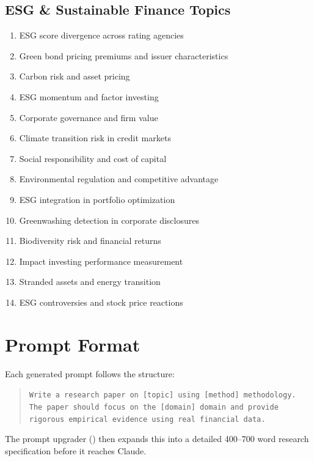 \subsection{ESG \& Sustainable Finance Topics}

\begin{enumerate}
  \item ESG score divergence across rating agencies
  \item Green bond pricing premiums and issuer characteristics
  \item Carbon risk and asset pricing
  \item ESG momentum and factor investing
  \item Corporate governance and firm value
  \item Climate transition risk in credit markets
  \item Social responsibility and cost of capital
  \item Environmental regulation and competitive advantage
  \item ESG integration in portfolio optimization
  \item Greenwashing detection in corporate disclosures
  \item Biodiversity risk and financial returns
  \item Impact investing performance measurement
  \item Stranded assets and energy transition
  \item ESG controversies and stock price reactions
\end{enumerate}

\section{Prompt Format}
\label{sec:prompts:format}

Each generated prompt follows the structure:

\begin{quote}
\texttt{Write a research paper on [topic] using [method] methodology.
The paper should focus on the [domain] domain and provide rigorous empirical evidence using real financial data.}
\end{quote}

The prompt upgrader () then expands this into a detailed 400--700 word research specification before it reaches Claude.
